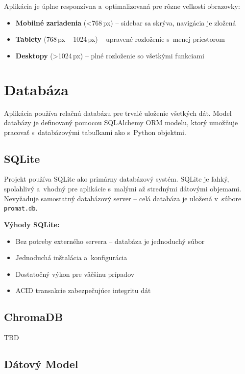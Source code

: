         Aplikácia je úplne responzívna a~optimalizovaná pre rôzne veľkosti obrazovky:

\begin{itemize}
  \item \textbf{Mobilné zariadenia} ({\textless}768\,px) -- sidebar sa skrýva, navigácia je zložená
  \item \textbf{Tablety} (768\,px -- 1024\,px) -- upravené rozloženie s~menej priestorom
  \item \textbf{Desktopy} ({\textgreater}1024\,px) -- plné rozloženie so všetkými funkciami
\end{itemize}

\section{Databáza}

        Aplikácia používa relačnú databázu pre trvalé uloženie všetkých dát. Model databázy
je definovaný pomocou SQLAlchemy ORM modelu, ktorý umožňuje pracovať s~databázovými
tabuľkami ako s~Python objektmi.

\subsection{SQLite}

        Projekt používa SQLite ako primárny databázový systém. SQLite je ľahký, spoľahlivý
a~vhodný pre aplikácie s~malými až strednými dátovými objemami. Nevyžaduje samostatný
databázový server -- celá databáza je uložená v~súbore \texttt{promat.db}.

        \textbf{Výhody SQLite:}

\begin{itemize}
  \item Bez potreby externého servera -- databáza je jednoduchý súbor
  \item Jednoduchá inštalácia a~konfigurácia
  \item Dostatočný výkon pre väčšinu prípadov
  \item ACID transakcie zabezpečujúce integritu dát
\end{itemize}

\subsection{ChromaDB}

TBD

\subsection{Dátový Model}

